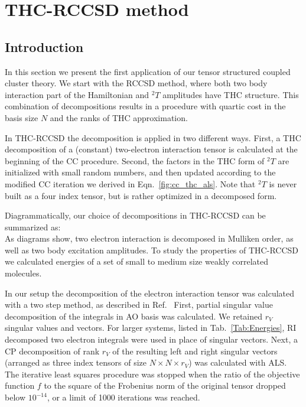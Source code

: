 \chapter{THC-RCCSD method
\label{sec:THC-RCCSD}}

\section{Introduction}
In this section we present the first application of our tensor structured 
coupled cluster theory. We start with the RCCSD method, where both two body 
interaction part of the Hamiltonian and ${}^2T$ amplitudes have THC structure. 
This combination of decompositions results in a procedure with quartic cost in 
the basis size $N$ and the ranks of THC approximation.

In THC-RCCSD the decomposition is applied in two different ways. First, a 
THC decomposition of a (constant) two-electron interaction tensor is 
calculated at the beginning of the CC procedure. Second, the factors in the 
THC form of ${}^2T$ are initialized with small random numbers, 
and then updated according to the modified CC iteration we derived in 
Eqn.~\ref{fig:cc_thc_als}. Note that ${}^2T$ is never built as 
a four index tensor, but is rather optimized in a decomposed form.

Diagrammatically, our choice of decompositions in THC-RCCSD can be summarized 
as:
%
\begin{equation}
\label{fig:rccsd_thc_def}
\end{equation}
%
As diagrams show, two electron interaction is decomposed in Mulliken order, as 
well as two body excitation amplitudes. To study the properties of THC-RCCSD 
we calculated energies of a set of small to medium size weakly correlated 
molecules.

In our setup the decomposition of the electron interaction tensor was 
calculated with a two step method, as described in 
Ref.~\cite{schutski2017tensor} First, partial singular value decomposition of 
the integrals in AO basis was calculated. We retained $r_{V}$ singular values 
and vectors. For larger systems, listed in Tab.~\ref{Tab:Energies}, RI 
decomposed two electron integrals were used in place of singular 
vectors. Next, a CP decomposition of rank $r_{V}$ of the resulting 
left and right singular vectors (arranged as three index tensors of size $N 
\times N \times r_{V}$) was calculated with ALS. The iterative least squares 
procedure was stopped when the ratio of the objective function $f$ to the 
square of the Frobenius norm of the original tensor dropped below $10^{-14}$, or 
a limit of 1000 iterations was reached.

